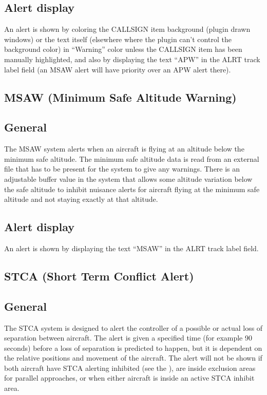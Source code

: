\documentclass[11pt,a4paper,oldfontcommands]{memoir}
\begin{document}
\subsection*{Alert display}

An alert is shown by coloring the CALLSIGN item background (plugin drawn windows) or the text itself (elsewhere where the plugin can’t control the background color) in “Warning” color unless the CALLSIGN item has been manually highlighted, and also by displaying the text “APW” in the ALRT track label field (an MSAW alert will have priority over an APW alert there).

\subsection{MSAW (Minimum Safe Altitude Warning)}

\subsection*{General}

The MSAW system alerts when an aircraft is flying at an altitude below the minimum safe altitude. The minimum safe altitude data is read from an external file that has to be present for the system to give any warnings. There is an adjustable buffer value in the system that allows some altitude variation below the safe altitude to inhibit nuisance alerts for aircraft flying at the minimum safe altitude and not staying exactly at that altitude.

\subsection*{Alert display}

An alert is shown by displaying the text “MSAW” in the ALRT track label field.

\subsection{STCA (Short Term Conflict Alert)}

\subsection*{General}

The STCA system is designed to alert the controller of a possible or actual loss of separation between aircraft. The alert is given a specified time (for example 90 seconds) before a loss of separation is predicted to happen, but it is dependent on the relative positions and movement of the aircraft. The alert will not be shown if both aircraft have STCA alerting inhibited (see the \textit{}), are inside exclusion areas for parallel approaches, or when either aircraft is inside an active STCA inhibit area.
\end{document}
